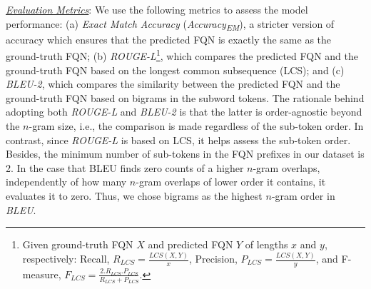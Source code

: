 \noindent\underline{\textit{Evaluation Metrics}}: We use the following metrics to assess the model performance: (a) \textit{Exact Match Accuracy} ({\em Accuracy\textsubscript{EM}}), a stricter version of accuracy which ensures that the predicted FQN is exactly the same as the ground-truth FQN; (b) \textit{ROUGE-L}\footnote{Given ground-truth FQN $X$ and predicted FQN $Y$ of lengths $x$ and $y$, respectively: Recall, $R_{LCS}=\frac{LCS(X, Y)}{x}$, Precision, $P_{LCS}=\frac{LCS(X, Y)}{y}$, and F-measure, $F_{LCS}=\frac{2.R_{LCS}.P_{LCS}}{R_{LCS}+P_{LCS}}$.}, which compares the predicted FQN and the ground-truth FQN based on the longest common subsequence (LCS); and (c) \textit{BLEU-2}, which compares the similarity between the predicted FQN and the ground-truth FQN based on bigrams in the subword tokens.
The rationale behind adopting both \textit{ROUGE-L} and \textit{BLEU-2} is that the latter is order-agnostic beyond the $n$-gram size, i.e., the comparison is made regardless of the sub-token order. In contrast, since \textit{ROUGE-L} is based on LCS, it helps assess the sub-token order. Besides, the minimum number of sub-tokens in the FQN prefixes in our dataset is 2. In the case that BLEU finds zero counts of a higher $n$-gram overlaps, independently of how many $n$-gram overlaps of lower order it contains, it evaluates it to zero. Thus, we chose bigrams as the highest $n$-gram order in \textit{BLEU}.


